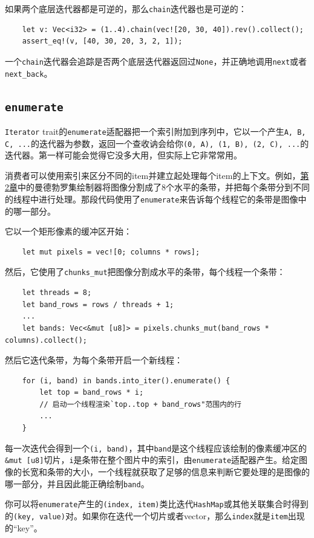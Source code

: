 如果两个底层迭代器都是可逆的，那么\texttt{chain}迭代器也是可逆的：
\begin{verbatim}
    let v: Vec<i32> = (1..4).chain(vec![20, 30, 40]).rev().collect();
    assert_eq!(v, [40, 30, 20, 3, 2, 1]);
\end{verbatim}

一个\texttt{chain}迭代器会追踪是否两个底层迭代器返回过\texttt{None}，并正确地调用\texttt{next}或者\texttt{next\_back}。

\subsection{\texttt{enumerate}}
\texttt{Iterator} trait的\texttt{enumerate}适配器把一个索引附加到序列中，它以一个产生\texttt{A, B, C, ...}的迭代器为参数，返回一个查收讷会给你\texttt{(0, A), (1, B), (2, C), ...}的迭代器。第一样可能会觉得它没多大用，但实际上它非常常用。

消费者可以使用索引来区分不同的item并建立起处理每个item的上下文。例如，\hyperref[ch02]{第2章}中的曼德勃罗集绘制器将图像分割成了8个水平的条带，并把每个条带分到不同的线程中进行处理。那段代码使用了\texttt{enumerate}来告诉每个线程它的条带是图像中的哪一部分。

它以一个矩形像素的缓冲区开始：
\begin{verbatim}
    let mut pixels = vec![0; columns * rows];
\end{verbatim}
然后，它使用了\texttt{chunks\_mut}把图像分割成水平的条带，每个线程一个条带：
\begin{verbatim}
    let threads = 8;
    let band_rows = rows / threads + 1;
    ...
    let bands: Vec<&mut [u8]> = pixels.chunks_mut(band_rows * columns).collect();
\end{verbatim}

然后它迭代条带，为每个条带开启一个新线程：
\begin{verbatim}
    for (i, band) in bands.into_iter().enumerate() {
        let top = band_rows * i;
        // 启动一个线程渲染`top..top + band_rows"范围内的行
        ...
    }
\end{verbatim}

每一次迭代会得到一个\texttt{(i, band)}，其中\texttt{band}是这个线程应该绘制的像素缓冲区的\texttt{\&mut [u8]}切片，\texttt{i}是条带在整个图片中的索引，由\texttt{enumerate}适配器产生。给定图像的长宽和条带的大小，一个线程就获取了足够的信息来判断它要处理的是图像的哪一部分，并且因此能正确绘制\texttt{band}。

你可以将\texttt{enumerate}产生的\texttt{(index, item)}类比迭代\texttt{HashMap}或其他关联集合时得到的\texttt{(key, value)}对。如果你在迭代一个切片或者vector，那么\texttt{index}就是\texttt{item}出现的“key”。

